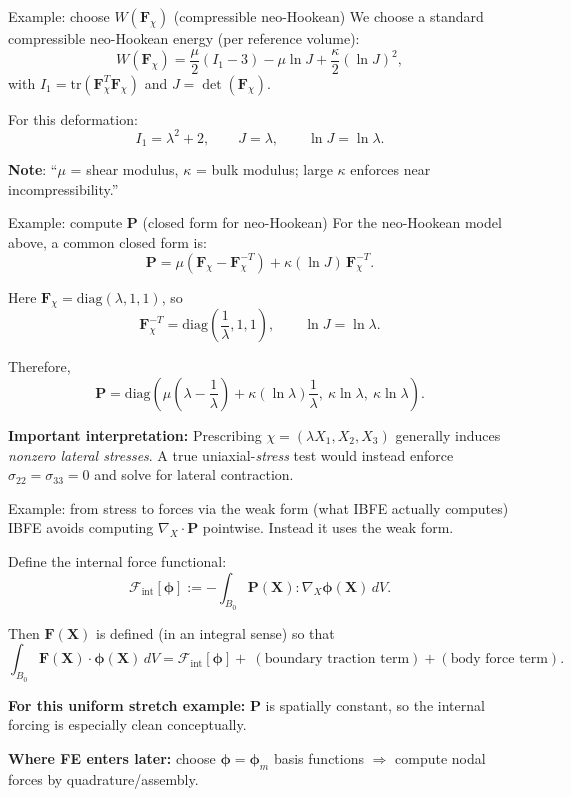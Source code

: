 \documentclass[aspectratio=169]{beamer}
\newcommand{\X}{\bm{X}}
\newcommand{\gradX}{\nabla_{\!X}}
\newcommand{\divX}{\nabla_{\!X}\!\cdot}
\newcommand{\Pten}{\bm{P}}        %
\newcommand{\Fdef}{\bm{F}_{\chi}} %
\newcommand{\FLag}{\bm{F}}       %
\begin{document}
\begin{frame}{Example: choose \(W(\Fdef)\) (compressible neo-Hookean)}
\small
We choose a standard compressible neo-Hookean energy (per reference volume):
\[
W(\Fdef)=\frac{\mu}{2}(I_1-3)-\mu\ln J+\frac{\kappa}{2}(\ln J)^2,
\]
with \(I_1=\mathrm{tr}(\Fdef^T\Fdef)\) and \(J=\det(\Fdef)\).

\medskip
For this deformation:
\[
I_1=\lambda^2+2,\qquad J=\lambda,\qquad \ln J = \ln \lambda.
\]

\medskip
\textbf{Note}: “\(\mu\) = shear modulus, \(\kappa\) = bulk modulus; large \(\kappa\) enforces near incompressibility.”
\end{frame}

\begin{frame}{Example: compute \(\Pten\) (closed form for neo-Hookean)}
\small
For the neo-Hookean model above, a common closed form is:
\[
\Pten = \mu\left(\Fdef-\Fdef^{-T}\right)+\kappa(\ln J)\,\Fdef^{-T}.
\]

\medskip
Here \(\Fdef=\mathrm{diag}(\lambda,1,1)\), so
\[
\Fdef^{-T}=\mathrm{diag}\left(\frac1\lambda,1,1\right),\qquad \ln J=\ln\lambda.
\]

Therefore,
\[
\Pten =
\mathrm{diag}\left(
\mu\left(\lambda-\frac1\lambda\right)+\kappa(\ln\lambda)\frac1\lambda,\ \kappa\ln\lambda,\ \kappa\ln\lambda
\right).
\]

\medskip
\textbf{Important interpretation:} Prescribing \(\chi=(\lambda X_1,X_2,X_3)\) generally induces \emph{nonzero lateral stresses}.
A true uniaxial-\emph{stress} test would instead enforce \(\sigma_{22}=\sigma_{33}=0\) and solve for lateral contraction.

\end{frame}

\begin{frame}{Example: from stress to forces via the weak form (what IBFE actually computes)}
\small
IBFE avoids computing \(\divX\Pten\) pointwise. Instead it uses the weak form.

\medskip
Define the internal force functional:
\[
\mathcal{F}_{\mathrm{int}}[\bm{\phi}]
:=
-\int_{B_0} \Pten(\X):\gradX\bm{\phi}(\X)\,dV.
\]

Then \(\FLag(\X)\) is defined (in an integral sense) so that
\[
\int_{B_0}\FLag(\X)\cdot\bm{\phi}(\X)\,dV
=
\mathcal{F}_{\mathrm{int}}[\bm{\phi}]
+\ (\text{boundary traction term}) + (\text{body force term}).
\]

\medskip
\textbf{For this uniform stretch example:} \(\Pten\) is spatially constant, so the internal forcing is especially clean conceptually.

\medskip
\textbf{Where FE enters later:} choose \(\bm{\phi}=\bm{\phi}_m\) basis functions \(\Rightarrow\) compute nodal forces by quadrature/assembly.

\end{frame}
\end{document}
